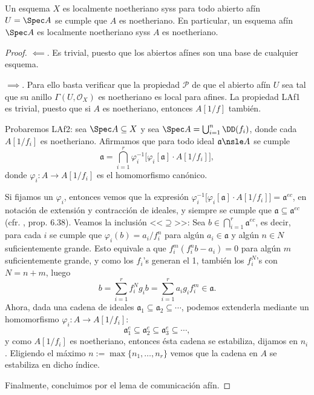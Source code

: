 \begin{prop}
	Un esquema $X$ es localmente noetheriano syss para todo abierto afín $U = \Spec A$ se cumple que $A$ es noetheriano.
	En particular, un esquema afín $\Spec A$ es localmente noetheriano syss $A$ es noetheriano.
\end{prop}
\begin{proof}
	$\impliedby$. Es trivial, puesto que los abiertos afínes son una base de cualquier esquema.

	$\implies$.
	Para ello basta verificar que la propiedad $\mathcal{P}$ de que el abierto afín $U$ sea tal que su anillo $\Gamma(U, \mathscr{O}_X)$ es noetheriano
	es local para afines.
	La propiedad LAf1 es trivial, puesto que si $A$ es noetheriano, entonces $A[1/f]$ también.

	Probaremos LAf2: sea $\Spec A \subseteq X$ y sea $\Spec A = \bigcup_{i=1}^{n} \DD(f_i)$, donde cada $A[1/f_i]$ es noetheriano.
	Afirmamos que para todo ideal $\mathfrak{a} \nsle A$ se cumple
	$$ \mathfrak{a} = \bigcap_{i=1}^{r} \varphi_i^{-1}\big[ \varphi_i[\mathfrak{a}] \cdot A[1/f_i] \big], $$
	donde $\varphi_i \colon A \to A[1/f_i ]$ es el homomorfismo canónico.

	Si fijamos un $\varphi_i$, entonces vemos que la expresión $\varphi_i^{-1}\big[ \varphi_i[\mathfrak{a}] \cdot A[1/f_i] \big] = \mathfrak{a}^{ec} $,
	en notación de extensión y contracción de ideales, y siempre se cumple que $\mathfrak{a} \subseteq \mathfrak{a}^{ec}$ (cfr. \cite{Alg}, prop. 6.38).
	Veamos la inclusión <<$\supseteq$>>: Sea $b \in \bigcap_{i=1}^{r} \mathfrak{a}^{ec}$, es decir, para cada $i$ se cumple que $\varphi_i(b) = a_i/f_i^n$
	para algún $a_i \in \mathfrak{a}$ y algún $n \in N$ suficientemente grande.
	Esto equivale a que $f_i^m(f_i^nb - a_i) = 0$ para algún $m$ suficientemente grande, y como los $f_i$'s generan el 1, también los $f_i^N$'s
	con $N = n + m$, luego
	$$ b = \sum_{i=1}^{r} f_i^N g_i b = \sum_{i=1}^{r} a_i g_i f_i^m \in \mathfrak{a}. $$
	Ahora, dada una cadena de ideales $\mathfrak{a}_1 \subseteq \mathfrak{a}_2 \subseteq \cdots $, podemos extenderla
	mediante un homomorfismo $\varphi_i \colon A \to A[1/f_i]$:
	$$ \mathfrak{a}^e_1 \subseteq \mathfrak{a}^e_2 \subseteq \mathfrak{a}^e_3 \subseteq \cdots, $$
	y como $A[1/f_i]$ es noetheriano, entonces ésta cadena se estabiliza, dijamos en $n_i$.
	Eligiendo el máximo $n := \max\{ n_1, \dots , n_r\}$ vemos que la cadena en $A$ se estabiliza en dicho índice.

	Finalmente, concluimos por el lema de comunicación afín.
\end{proof}

